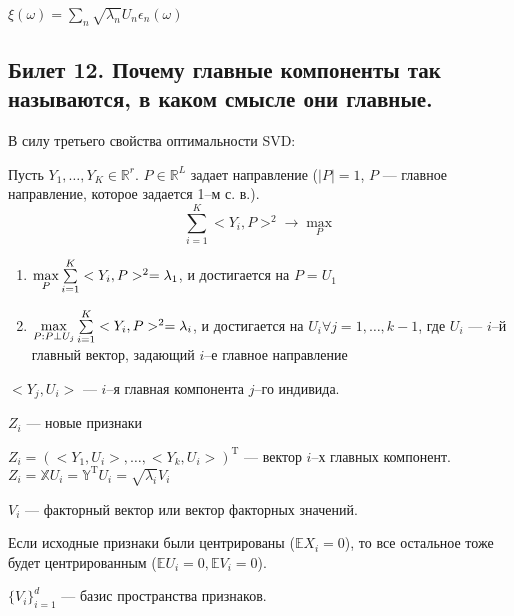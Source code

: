 $\xi(\omega) = \sum \limits_{n} \sqrt{\lambda_n} U_n \epsilon_n (\omega)$
\subsection{Билет 12. Почему главные компоненты так называются, в каком смысле они главные.}

В силу третьего свойства оптимальности SVD:

Пусть $Y_1, \dots, Y_K \in \mathbb{R}^r$. $P \in \mathbb{R}^L$ задает направление ($|P| = 1$, $P$ --- главное направление, которое задается 1--м с. в.).
\begin{equation*}
\sum \limits_{i = 1}^K < Y_i, P >^2 \longrightarrow \max \limits_{P}
\end{equation*}

\begin{sug}
\begin{enumerate}
\item $\max \limits_{P} \sum\limits_{i = 1}^K < Y_i, P >^2 = \lambda_1$, и достигается на $P = U_1$
\item $\max \limits_{P: P \perp U_j} \sum\limits_{i = 1}^K < Y_i, P >^2 = \lambda_i$, и достигается на $U_i \forall j = 1, \dots, k - 1$, где $U_i$ --- $i$--й главный вектор, задающий $i$--е главное направление
\end{enumerate}
\end{sug}

$< Y_j, U_i >$ --- $i$--я главная компонента $j$--го индивида.\\
\begin{design}
$Z_i$ --- новые признаки
\end{design}
$Z_i = (< Y_1, U_i >, \dots, < Y_k, U_i >)^{\mathrm{T}}$ --- вектор $i$--х главных компонент.\\
$Z_i = \mathbb{X}U_i = \mathbb{Y}^{\mathrm{T}}U_i = \sqrt{\lambda_i}V_i$\\

\begin{design}
$V_i$ --- факторный вектор или вектор факторных значений.
\end{design}

\begin{note}

Если исходные признаки были центрированы ($\mathbb{E}X_i = 0$), то  все остальное тоже будет центрированным ($\mathbb{E}U_i = 0, \mathbb{E}V_i = 0$).
\end{note}

\begin{design}
$\{V_i\}_{i = 1}^d$ --- базис пространства признаков.
\end{design}

